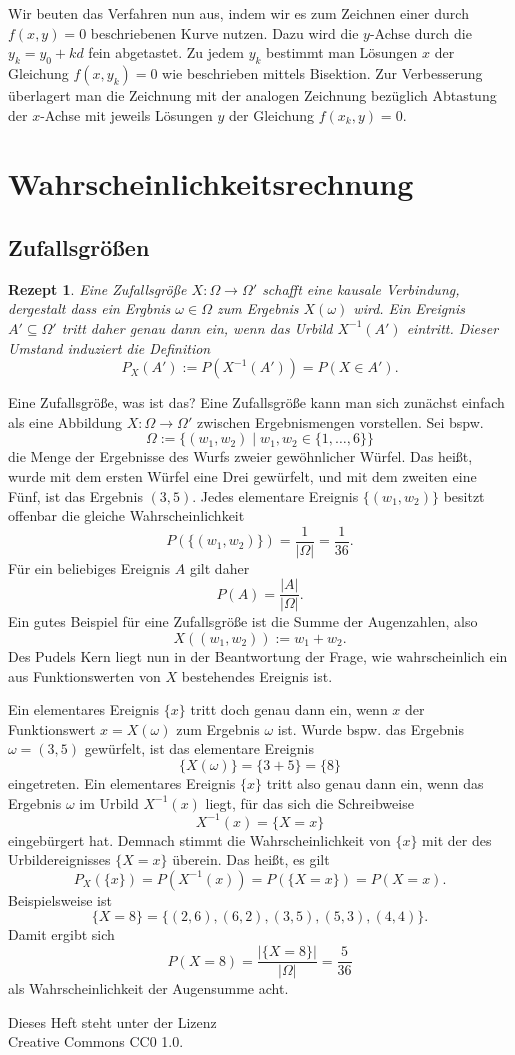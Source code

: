 \documentclass[a4paper,10pt,fleqn,twocolumn,twoside,dvipdfmx]{scrartcl}
\theoremstyle{rmbox}
\newtheorem{Rezept}{Rezept}[section]
\begin{document}
Wir beuten das Verfahren nun aus, indem wir es zum Zeichnen einer
durch $f(x,y)=0$ beschriebenen Kurve nutzen. Dazu wird die
$y$-Achse durch die $y_k=y_0+kd$ fein abgetastet. Zu jedem $y_k$
bestimmt man Lösungen $x$ der Gleichung $f(x,y_k)=0$ wie beschrieben
mittels Bisektion. Zur Verbesserung überlagert man die Zeichnung mit
der analogen Zeichnung bezüglich Abtastung der $x$-Achse mit jeweils
Lösungen $y$ der Gleichung $f(x_k,y)=0$.




\newpage
\section{Wahrscheinlichkeitsrechnung}

\subsection{Zufallsgrößen}

\begin{Rezept}
Eine Zufallsgröße $X\colon\Omega\to\Omega'$ schafft eine kausale
Verbindung, dergestalt dass ein Ergbnis $\omega\in\Omega$ zum
Ergebnis $X(\omega)$ wird. Ein Ereignis $A'\subseteq\Omega'$
tritt daher genau dann ein, wenn das Urbild $X^{-1}(A')$ eintritt.
Dieser Umstand induziert die Definition
\[P_X(A') := P(X^{-1}(A')) = P(X\in A').\]
\end{Rezept}

\noindent
Eine Zufallsgröße, was ist das? Eine Zufallsgröße kann man sich
zunächst einfach als eine Abbildung $X\colon\Omega\to\Omega'$ zwischen
Ergebnismengen vorstellen. Sei bspw.
\[\Omega := \{(w_1,w_2)\mid w_1,w_2\in\{1,\ldots,6\}\}\]
die Menge der Ergebnisse des Wurfs zweier gewöhnlicher
Würfel. Das heißt, wurde mit dem ersten Würfel eine Drei
gewürfelt, und mit dem zweiten eine Fünf, ist das Ergebnis $(3, 5)$.
Jedes elementare Ereignis $\{(w_1,w_2)\}$ besitzt offenbar
die gleiche Wahrscheinlichkeit%
\[P(\{(w_1,w_2)\}) = \frac{1}{|\Omega|} = \frac{1}{36}.\]
Für ein beliebiges Ereignis $A$ gilt daher%
\[P(A) = \frac{|A|}{|\Omega|}.\]
Ein gutes Beispiel für eine Zufallsgröße ist die Summe der
Augenzahlen, also%
\[X((w_1,w_2)) := w_1 + w_2.\]
Des Pudels Kern liegt nun in der Beantwortung der Frage, wie
wahrscheinlich ein aus Funktionswerten von $X$ bestehendes
Ereignis ist.

Ein elementares Ereignis $\{x\}$ tritt doch genau dann ein,
wenn $x$ der Funktionswert $x=X(\omega)$ zum Ergebnis
$\omega$ ist. Wurde bspw. das Ergebnis $\omega=(3, 5)$
gewürfelt, ist das elementare Ereignis%
\[\{X(\omega)\} = \{3 + 5\} = \{8\}\]
eingetreten.
Ein elementares Ereignis $\{x\}$ tritt also genau dann ein, wenn das
Ergebnis $\omega$ im Urbild $X^{-1}(x)$ liegt, für das sich die
Schreibweise%
\[X^{-1}(x)=\{X=x\}\]
eingebürgert hat. Demnach stimmt die Wahrscheinlichkeit von $\{x\}$
mit der des Urbildereignisses $\{X=x\}$ überein. Das heißt, es gilt%
\[P_X(\{x\}) = P(X^{-1}(x)) = P(\{X=x\}) = P(X=x).\]
Beispielsweise ist
\[\{X=8\} = \{(2,6), (6,2), (3,5), (5,3), (4,4)\}.\]
Damit ergibt sich
\[P(X=8) = \frac{|\{X=8\}|}{|\Omega|} = \frac{5}{36}\]
als Wahrscheinlichkeit der Augensumme acht.


\vfill\noindent
Dieses Heft steht unter der Lizenz\\
Creative Commons CC0 1.0.
\end{document}
